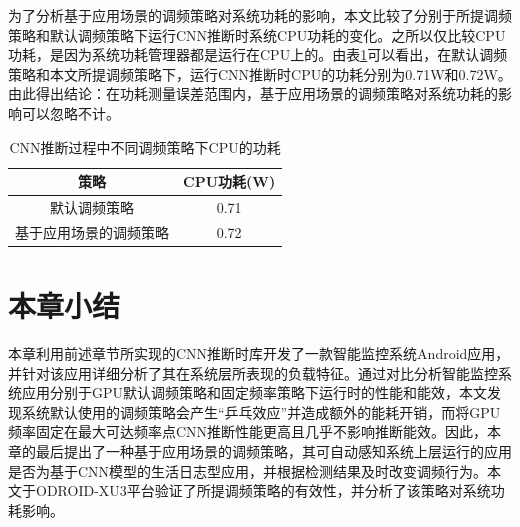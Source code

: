 为了分析基于应用场景的调频策略对系统功耗的影响，本文比较了分别于所提调频策略和默认调频策略下运行CNN推断时系统CPU功耗的变化。之所以仅比较CPU功耗，是因为系统功耗管理器都是运行在CPU上的。由表\ref{table:table12}可以看出，在默认调频策略和本文所提调频策略下，运行CNN推断时CPU的功耗分别为0.71W和0.72W。由此得出结论：在功耗测量误差范围内，基于应用场景的调频策略对系统功耗的影响可以忽略不计。

\begin{table}[htbp]
  \centering
  \caption{CNN推断过程中不同调频策略下CPU的功耗}
  \label{table:table12}
  \begin{tabular}{cc}
    \toprule
      策略 & CPU功耗(W) \\
    \midrule
      默认调频策略 & 0.71 \\
      基于应用场景的调频策略 & 0.72 \\
    \bottomrule
  \end{tabular}
\end{table}

\section{本章小结}
本章利用前述章节所实现的CNN推断时库开发了一款智能监控系统Android应用，并针对该应用详细分析了其在系统层所表现的负载特征。通过对比分析智能监控系统应用分别于GPU默认调频策略和固定频率策略下运行时的性能和能效，本文发现系统默认使用的调频策略会产生“乒乓效应”并造成额外的能耗开销，而将GPU频率固定在最大可达频率点CNN推断性能更高且几乎不影响推断能效。因此，本章的最后提出了一种基于应用场景的调频策略，其可自动感知系统上层运行的应用是否为基于CNN模型的生活日志型应用，并根据检测结果及时改变调频行为。本文于ODROID-XU3平台验证了所提调频策略的有效性，并分析了该策略对系统功耗影响。

\cleardoublepage 
